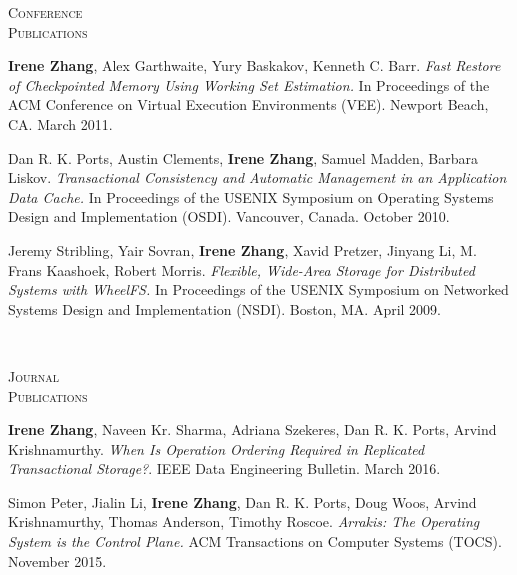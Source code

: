 \documentclass[10pt,times]{report}
\newlength{\sectiongap}
\newlength{\sectioncolwidth}
\newlength{\colgap}
\newlength{\stuffwidth}
\newenvironment{rtable}{
  \begin{minipage}{\textwidth}
  }{
  \end{minipage}
}
\newenvironment{rsection}[1]{
  \begin{minipage}[t]{\sectioncolwidth}
    \textsc{#1}
  \end{minipage}
  \hspace{\colgap}
  \begin{minipage}[t]{\stuffwidth}
  }{
    \removelastskip
  \end{minipage}
  \\[\sectiongap]
}
\begin{document}
\begin{rtable}
\begin{rsection}{Conference\\Publications}
   \textbf{Irene Zhang}, Alex Garthwaite, Yury Baskakov, Kenneth
   C. Barr. \textit{Fast Restore of Checkpointed Memory Using Working
     Set Estimation.}  In Proceedings of the ACM Conference on Virtual
   Execution Environments (VEE). Newport Beach, CA. March 2011.\\\vspace{-0.5em}

   Dan R. K. Ports, Austin Clements, \textbf{Irene Zhang}, Samuel
   Madden, Barbara Liskov. \textit{Transactional Consistency and
     Automatic Management in an Application Data Cache.}  In
   Proceedings of the USENIX Symposium on Operating Systems Design and
   Implementation (OSDI). Vancouver, Canada. October 2010.\\\vspace{-0.5em}

   Jeremy Stribling, Yair Sovran, \textbf{Irene Zhang}, Xavid Pretzer,
   Jinyang Li, M. Frans Kaashoek, Robert Morris. \textit{Flexible,
     Wide-Area Storage for Distributed Systems with WheelFS.}  In
   Proceedings of the USENIX Symposium on Networked Systems Design and
   Implementation (NSDI).  Boston, MA. April 2009. \\\vspace{-0.5em}
  \end{rsection}

  \begin{rsection}{Journal\\Publications}
    \textbf{Irene Zhang}, Naveen Kr. Sharma, Adriana Szekeres, Dan
   R. K. Ports, Arvind Krishnamurthy. \textit{When Is Operation
     Ordering Required in Replicated Transactional Storage?}.  IEEE
   Data Engineering Bulletin. March 2016.\\\vspace{-0.5em}

   Simon Peter, Jialin Li, \textbf{Irene Zhang}, Dan R. K. Ports, Doug
   Woos, Arvind Krishnamurthy, Thomas Anderson, Timothy Roscoe.
   \textit{Arrakis: The Operating System is the Control Plane.}  ACM
   Transactions on Computer Systems (TOCS). November
   2015.\\\vspace{-0.5em}
  \end{rsection}



\end{rtable}
\end{document}
